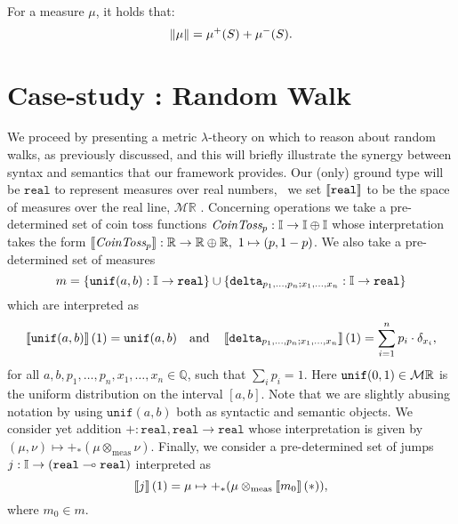 \begin{proposition}  \cite[Section 3.1]{bogachevMeasureTheory2007} \label{def:signed_meas}
   For a measure \( \mu \), it holds that:
   \[\left\lVert \mu \right\rVert = \mu^{+}(S) + \mu^{-}(S).\] 
\end{proposition}

 

  
\section{Case-study : Random Walk}

 

We proceed by presenting a metric $\lambda$-theory on which to reason about random walks, as previously discussed, and this will briefly illustrate the synergy between syntax and semantics that our framework provides. Our (only) ground type
will be $\mathtt{real}$ to represent measures over real numbers, \ie\ we set
$\left \llbracket \mathtt{real} \right \rrbracket$ to be the space of measures over the real line, $\mathcal{M}\mathbb{R}$ .
Concerning operations we take a pre-determined set of coin toss functions $\emph{CoinToss}_p : \mathbb{I} \to \mathbb{I} \oplus \mathbb{I}$ whose interpretation takes the form $\left \llbracket \emph{CoinToss}_p \right \rrbracket:\mathbb{R} \to \mathbb{R} \oplus \mathbb{R},\ 1 \mapsto (p, 1-p)$.
We also take a pre-determined set of measures 
$$ m = \{\mathtt{unif}(a,b) : \mathbb{I} \to \mathtt{real} \} \cup \{\mathtt{delta}_{p_1,\ldots,p_n;x_1,\ldots,x_n} : \mathbb{I} \to \mathtt{real}\} $$ 
which are interpreted as 
$$ \left \llbracket \mathtt{unif}(a,b) \right \rrbracket (1) = \mathtt{unif}(a,b) \quad \text{and} \quad \left \llbracket \mathtt{delta}_{p_1,\ldots,p_n; x_1,\ldots,x_n} \right \rrbracket(1) = \sum_{i=1}^n p_i\cdot \delta_{x_i},  $$
for all $a,b, p_1,\ldots,p_n,  x_1,\ldots,x_n \in \mathbb{Q}$, such that $\sum_i p_i = 1$. Here $\mathtt{unif}(0,1) \in \mathcal{M}\mathbb{R}$ is the uniform distribution on the interval $[a,b]$.
Note that we are slightly abusing notation by using $\mathtt{unif}(a,b)$ both as syntactic and semantic objects. We consider yet addition $+ : \mathtt{real},\mathtt{real}
\to \mathtt{real}$ whose interpretation is given by $(\mu, \nu) \mapsto
+_\ast(\mu \otimes_{\text{meas}} \nu)$.
Finally, we consider a pre-determined set of jumps $j: \mathbb{I} \to (\mathtt{real} \multimap \mathtt{real}) $ interpreted as 
\[ 
\left \llbracket j \right \rrbracket(1)= \mu \mapsto +_\ast(\mu \otimes_{\text{meas}} \left \llbracket m_0 \right \rrbracket(*)),
\]
where $m_0 \in m$.




